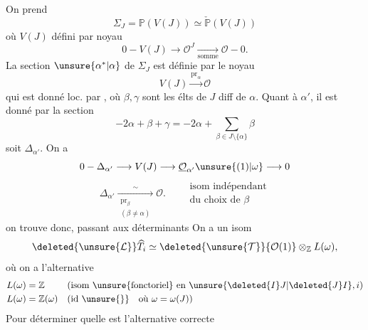 On prend
\[
\Sigma_J=\mathbb P(V(J))\simeq\check{\mathbb P}(V(J))
\]
où $V(J)$ défini par noyau
\[
0\mathbin{-}V(J)\longrightarrow\mathcal O^J\xrightarrow[\text{somme}]{}\mathcal O\mathbin{-}0.
\]
La section $\unsure{\alpha^*|\alpha}$ de $\Sigma_J$ est définie par le noyau
\[
V(J)\xrightarrow{\operatorname{pr}_\alpha}\mathcal O
\]
qui est donné  loc. par \deleted{$\unsure{\alpha\mapsto\lambda\beta-\lambda\gamma}$}, où $\beta,\gamma$ sont les élts de $J$ diff de $\alpha$. Quant à $\alpha'$, il est donné par la section
\[
-2\alpha+\beta+\gamma=-2\alpha+\sum_{\beta\in J\setminus\{\alpha\}}\beta
\]
soit $\Delta_{\alpha'}$. On a
\[
0\mathbin{-}\Delta_{\alpha'}\longrightarrow V(J)\longrightarrow\underline{\mathcal O}_{\alpha'}\unsure{(1)|\omega}\longrightarrow0
\]
\[
\Delta_{\alpha'}\xrightarrow[\substack{\operatorname{pr}_\beta\\(\beta\ne\alpha)}]{\sim}\mathcal O.
\qquad\substack{\text{isom indépendant}\\\text{du choix de }\beta}
\]
on trouve donc, passant aux déterminants
On a un isom
\[
\deleted{\unsure{\mathcal L}}\widehat T_i\simeq\deleted{\unsure{\mathcal T}}\{\mathcal O(1)\}\otimes_{\mathbb Z}L(\omega),
\]
où on a l'alternative
\[
\begin{aligned}
L(\omega)&=\mathbb Z&&\text{(isom }\unsure{\text{fonctoriel}}\text{ en }\unsure{\deleted{I}J|\deleted{J}I},i\text{)}\\
L(\omega)&=\mathbb Z(\omega)&&\text{(id}\ \unsure{\}}\quad\text{où }\omega=\omega(J)\text{)}
\end{aligned}
\]
Pour déterminer quelle est l'alternative correcte
